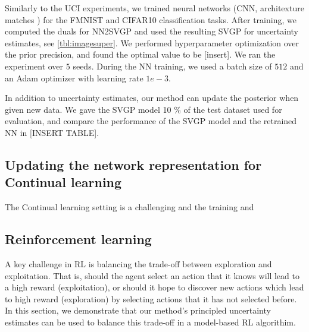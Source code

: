 \documentclass{article}
\newlength{\tblw}
\begin{document}
Similarly to the UCI experiments, we trained neural networks (CNN, architexture matches \citet{immer2021improving}) for the FMNIST and CIFAR10 classification tasks. After training, we computed the duals for NN2SVGP and used the resulting SVGP for uncertainty estimates, see \cref{tbl:imagesuper}. We performed hyperparameter optimization over the prior precision, and found the optimal value to be [insert]. We ran the experiment over $5$ seeds. During the NN training, we used a batch size of $512$ and an Adam optimizer with learning rate $1e-3$.

In addition to uncertainty estimates, our method can update the posterior when given new data. We gave the SVGP model 10 \% of the test dataset used for evaluation, and compare the performance of the SVGP model and the retrained NN in [INSERT TABLE]. 

\subsection{Updating the  network representation for Continual learning}
The Continual learning setting is a challenging and the training and


\begin{table}[t!] 
  \centering\scriptsize
  \caption{
  TODO: CL Experiments. $^*$ Methods relying only on weight regularization. 
  }
	\label{tbl:cl_table_1}
	\renewcommand{\arraystretch}{1.}
	\setlength{\tabcolsep}{2pt}
	\setlength{\tblw}{0.14\textwidth}  
	
	\newcommand{\val}[2]{%
		$#1$\textcolor{gray}{\tiny ${\pm}#2$}
	} 
	
	
\end{table}


\subsection{Reinforcement learning}
A key challenge in RL is balancing the trade-off between exploration and exploitation.
That is, should the agent select an action that it knows will lead to a high reward (exploitation), or should it
hope to discover new actions which lead to high reward (exploration) by selecting actions that it has not selected before.
In this section, we demonstrate  that our method's principled uncertainty estimates can be used to balance this trade-off in a model-based RL algorithim.
\end{document}
